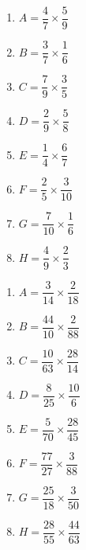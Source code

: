 \documentclass[11pt]{article}
\begin{document}
\begin{exercice}[1]
\begin{multicols}{2}
\begin{enumerate}[itemsep=3em,label={}]
	\item  $A = \dfrac{4}{7}\times\dfrac{5}{9}$ 
	\item  $B = \dfrac{3}{7}\times\dfrac{1}{6}$ 
	\item  $C = \dfrac{7}{9}\times\dfrac{3}{5}$ 
	\item  $D = \dfrac{2}{9}\times\dfrac{5}{8}$ 
	\item  $E = \dfrac{1}{4}\times\dfrac{6}{7}$ 
	\item  $F = \dfrac{2}{5}\times\dfrac{3}{10}$ 
	\item  $G = \dfrac{7}{10}\times\dfrac{1}{6}$ 
	\item  $H = \dfrac{4}{9}\times\dfrac{2}{3}$ 
\end{enumerate}
\end{multicols}
\end{exercice}


\begin{exercice}[2]
\begin{multicols}{2}
\begin{enumerate}[itemsep=3em,label={}]
	\item  $A = \dfrac{3}{14}\times\dfrac{2}{18}$ 
	\item  $B = \dfrac{44}{10}\times\dfrac{2}{88}$ 
	\item  $C = \dfrac{10}{63}\times\dfrac{28}{14}$ 
	\item  $D = \dfrac{8}{25}\times\dfrac{10}{6}$ 
	\item  $E = \dfrac{5}{70}\times\dfrac{28}{45}$ 
	\item  $F = \dfrac{77}{27}\times\dfrac{3}{88}$ 
	\item  $G = \dfrac{25}{18}\times\dfrac{3}{50}$ 
	\item  $H = \dfrac{28}{55}\times\dfrac{44}{63}$ 
\end{enumerate}
\end{multicols}
\end{exercice}

\newpage
\end{document}
